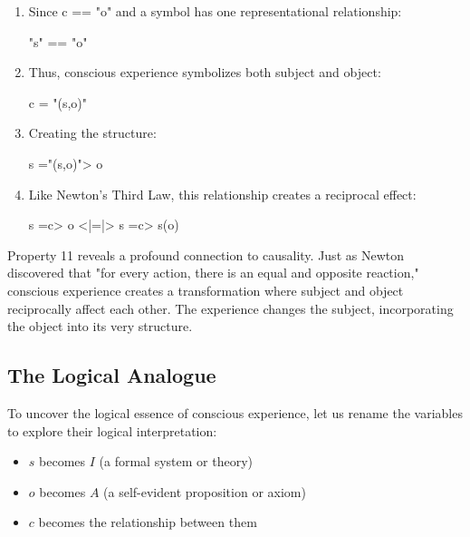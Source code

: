 \documentclass[runningheads]{llncs}
\begin{document}
\begin{enumerate}
    \begin{center}
    "s" =c> s
    \end{center}
    
    \item Since c == "o" and a symbol has one representational relationship: 
    
    \begin{center}
    "s" == "o"
    \end{center}
    
    \item Thus, conscious experience symbolizes both subject and object: 
    
    \begin{center}
    c = "(s,o)"
    \end{center}
    
    \item Creating the structure: 
    
    \begin{center}
    s ="(s,o)"> o
    \end{center}
    
    \item Like Newton's Third Law, this relationship creates a reciprocal effect: 
    
    \begin{center}
    s =c> o <|=|> s =c> s(o)
    \end{center}
\end{enumerate}

Property 11 reveals a profound connection to causality. Just as Newton discovered that "for every action, there is an equal and opposite reaction," conscious experience creates a transformation where subject and object reciprocally affect each other. The experience changes the subject, incorporating the object into its very structure.

\subsection{The Logical Analogue}

To uncover the logical essence of conscious experience, let us rename the variables to explore their logical interpretation:

\begin{itemize}
    \item $s$ becomes $I$ (a formal system or theory)
    \item $o$ becomes $A$ (a self-evident proposition or axiom)
    \item $c$ becomes the relationship between them
\end{itemize}
\end{document}
